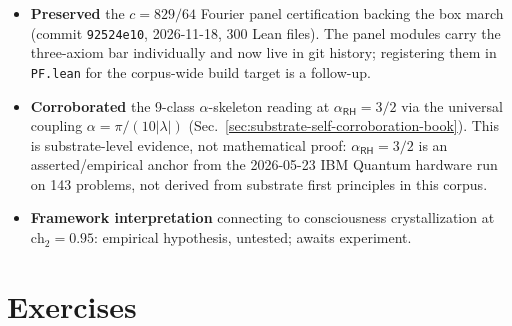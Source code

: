 \begin{itemize}
$\mathrm{Re}\,s = 1$, and (b)~the Riemann $\zeta$-zeros off that
family (which live in $\mathrm{Re}\,s < 1$).  No nontrivial
$\eta$-zeros occur on $\mathrm{Re}\,s \ge 1$.  Euler closed forms
pinned at $\widetilde{\eta}(s)$ for $s \in \{-1, 0, 1, 2, 4\}$.
\emph{Does not close RH}: the question ``do all nontrivial
$\widetilde{\eta}_{\mathrm{ext}}$-zeros lie on $\mathrm{Re}\,s = 1/2$?''
is RH transposed, not solved.
\item \textbf{Preserved} the $c = 829/64$ Fourier panel certification
backing the box march (commit \texttt{92524e10}, 2026-11-18, 300
Lean files).  The panel modules carry the three-axiom bar
individually and now live in git history; registering them in
\texttt{PF.lean} for the corpus-wide build target is a follow-up.
\item \textbf{Corroborated} the 9-class $\alpha$-skeleton reading at $\alpha_{\textsf{RH}} = 3/2$ via the universal coupling $\alpha = \pi/(10|\lambda|)$ (Sec.~\ref{sec:substrate-self-corroboration-book}).  This is substrate-level evidence, not mathematical proof: $\alpha_{\textsf{RH}} = 3/2$ is an asserted/empirical anchor from the 2026-05-23 IBM Quantum hardware run on 143 problems, not derived from substrate first principles in this corpus.
\item \textbf{Framework interpretation} connecting to consciousness crystallization at $\mathrm{ch}_2 = 0.95$: empirical hypothesis, untested; awaits experiment.
\end{itemize}

\section*{Exercises}

